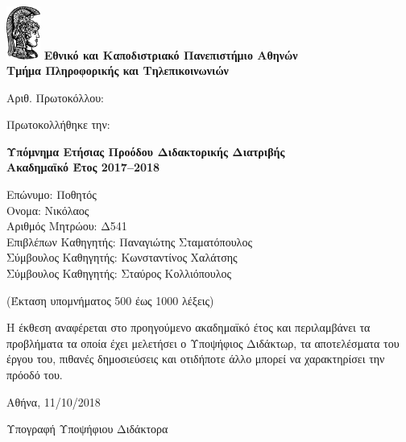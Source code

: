 \documentclass[a4paper]{article}
\begin{document}

\includegraphics[width=3em]{athena}
\textbf{\large
        Εθνικό και Καποδιστριακό Πανεπιστήμιο Αθηνών \\
        Τμήμα Πληροφορικής και Τηλεπικοινωνιών}

\begin{center}
  Αριθ. Πρωτοκόλλου:

  Πρωτοκολλήθηκε την:

  \large
  \textbf{Υπόμνημα Ετήσιας Προόδου Διδακτορικής Διατριβής \\
          Ακαδημαϊκό Έτος 2017–2018}
\end{center}

Επώνυμο: Ποθητός \\
Ονομα: Νικόλαος \\
Αριθμός Μητρώου: Δ541 \\
Επιβλέπων Καθηγητής: Παναγιώτης Σταματόπουλος \\
Σύμβουλος Καθηγητής: Κωνσταντίνος Χαλάτσης \\
Σύμβουλος Καθηγητής: Σταύρος Κολλιόπουλος

\begin{center}
  (Έκταση υπομνήματος 500 έως 1000 λέξεις)
\end{center}

Η έκθεση αναφέρεται στο προηγούμενο ακαδημαϊκό έτος και
περιλαμβάνει τα προβλήματα τα οποία έχει μελετήσει ο
Υποψήφιος Διδάκτωρ, τα αποτελέσματα του έργου του, πιθανές
δημοσιεύσεις και οτιδήποτε άλλο μπορεί να χαρακτηρίσει την
πρόοδό του.

\begin{center}
  Αθήνα, 11/10/2018

  Υπογραφή Υποψήφιου Διδάκτορα
\end{center}
\end{document}
